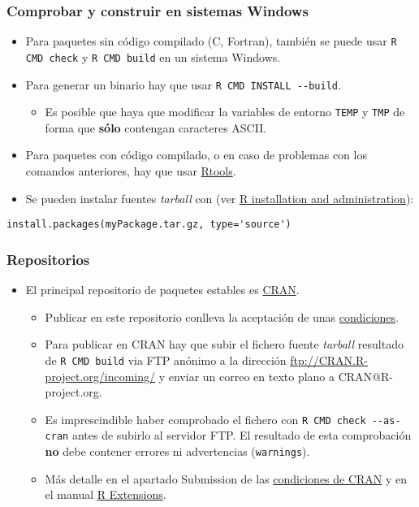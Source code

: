 \documentclass[xcolor={usenames,svgnames,dvipsnames}]{beamer}
\begin{document}
\begin{frame}[fragile]
\frametitle{Comprobar y construir en sistemas Windows}
\label{sec-3-4}


\begin{itemize}
\item Para paquetes sin código compilado (C, Fortran), también se puede usar
  \texttt{R CMD check} y \texttt{R CMD build} en un sistema Windows.
\item Para generar un binario hay que usar \texttt{R CMD INSTALL -{}-build}.
\begin{itemize}
\item Es posible que haya que modificar la variables de entorno
    \texttt{TEMP} y \texttt{TMP} de forma que \textbf{sólo} contengan caracteres ASCII.
\end{itemize}
\item Para paquetes con código compilado, o en caso de problemas con
  los comandos anteriores, hay que usar \href{http://cran.r-project.org/bin/windows/Rtools/}{Rtools}.
\item Se pueden instalar fuentes \emph{tarball} con (ver \href{http://cran.r-project.org/doc/manuals/R-admin.html#Windows-packages}{R installation and administration}):
\end{itemize}

\begin{verbatim}
install.packages(myPackage.tar.gz, type='source')
\end{verbatim}
\end{frame}
\begin{frame}
\frametitle{Repositorios}
\label{sec-3-5}

\begin{itemize}
\item El principal repositorio de paquetes estables es \href{http://cran.r-project.org/}{CRAN}.
\begin{itemize}
\item Publicar en este repositorio conlleva la aceptación de unas \href{http://cran.r-project.org/web/packages/policies.html}{condiciones}.
\item Para publicar en CRAN hay que subir el fichero fuente
    \emph{tarball} resultado de \texttt{R CMD build} via FTP anónimo a la
    dirección \href{ftp://CRAN.R-project.org/incoming/}{ftp://CRAN.R-project.org/incoming/} y enviar un
    correo en texto plano a CRAN@R-project.org.
\item Es imprescindible haber comprobado el fichero con \texttt{R CMD check     -{}-as-cran} antes de subirlo al servidor FTP. El resultado de
    esta comprobación \textbf{no} debe contener errores ni advertencias
    (\texttt{warnings}).
\item Más detalle en el apartado Submission de las \href{http://cran.r-project.org/web/packages/policies.html}{condiciones de CRAN} y en el manual \href{http://cran.r-project.org/doc/manuals/R-exts.html\#Submitting-a-package-to-CRAN}{R Extensions}.
\end{itemize}
\end{itemize}
\end{frame}
\end{document}
